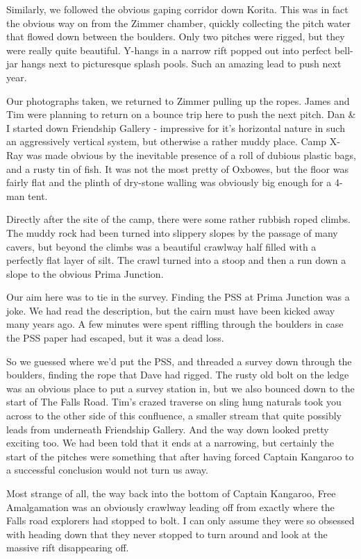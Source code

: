 Similarly, we followed the obvious gaping corridor down Korita. This was
in fact the obvious way on from the Zimmer chamber, quickly collecting
the pitch water that flowed down between the boulders. Only two pitches
were rigged, but they were really quite beautiful. Y-hangs in a narrow
rift popped out into perfect bell-jar hangs next to picturesque splash
pools. Such an amazing lead to push next year.

Our photographs taken, we returned to Zimmer pulling up the ropes. James
and Tim were planning to return on a bounce trip here to push the next
pitch. Dan \& I started down Friendship Gallery - impressive for it's
horizontal nature in such an aggressively vertical system, but otherwise
a rather muddy place. Camp X-Ray was made obvious by the inevitable
presence of a roll of dubious plastic bags, and a rusty tin of fish. It
was not the most pretty of Oxbowes, but the floor was fairly flat and
the plinth of dry-stone walling was obviously big enough for a 4-man
tent.

Directly after the site of the camp, there were some rather rubbish
roped climbs. The muddy rock had been turned into slippery slopes by the
passage of many cavers, but beyond the climbs was a beautiful crawlway
half filled with a perfectly flat layer of silt. The crawl turned into a
stoop and then a run down a slope to the obvious Prima Junction.

Our aim here was to tie in the survey. Finding the PSS at Prima Junction
was a joke. We had read the description, but the cairn must have been
kicked away many years ago. A few minutes were spent riffling through
the boulders in case the PSS paper had escaped, but it was a dead loss.

So we guessed where we'd put the PSS, and threaded a survey down through
the boulders, finding the rope that Dave had rigged. The rusty old bolt
on the ledge was an obvious place to put a survey station in, but we
also bounced down to the start of The Falls Road. Tim's crazed traverse
on sling hung naturals took you across to the other side of this
confluence, a smaller stream that quite possibly leads from underneath
Friendship Gallery. And the way down looked pretty exciting too. We had
been told that it ends at a narrowing, but certainly the start of the
pitches were something that after having forced Captain Kangaroo to a
successful conclusion would not turn us away.

Most strange of all, the way back into the bottom of Captain Kangaroo,
Free Amalgamation was an obviously crawlway leading off from exactly
where the Falls road explorers had stopped to bolt. I can only assume
they were so obsessed with heading down that they never stopped to turn
around and look at the massive rift disappearing off.

